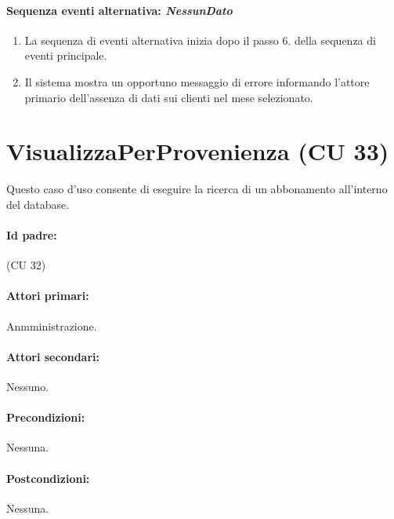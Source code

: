 \documentclass{article}
\begin{document}
		\paragraph{Sequenza eventi alternativa: \textit{NessunDato}}
	\begin{enumerate}	[leftmargin=28pt]
			\item  La sequenza di eventi alternativa inizia dopo il passo 6. della sequenza di eventi principale.
			\item  Il sistema mostra un opportuno messaggio di errore informando l'attore primario dell'assenza di dati sui clienti nel mese selezionato.
		\end{enumerate}
	





\newpage
\section*{VisualizzaPerProvenienza (CU 33)}
	
	Questo caso d'uso consente di eseguire la ricerca di un abbonamento all'interno del database.
	
	\paragraph{Id padre:} (CU 32)
	
	\paragraph{Attori primari:}Anmministrazione.
	
	\paragraph{Attori secondari:}Nessuno.
	
	\paragraph{Precondizioni:}Nessuna.
	
	\paragraph{Postcondizioni:}Nessuna.
	
\end{document}
